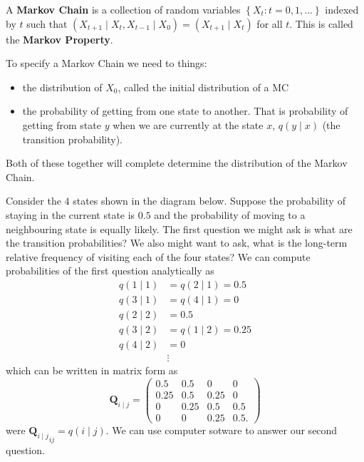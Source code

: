 \begin{defe} \label{defe: markov_chain}
    A {\bf Markov Chain} is a collection of random variables $\left\{ X_t : t = 0,1,\ldots \right\}$ indexed by $t$ such that $(X_{t+1} \mid X_{t} , X_{t-1} \mid X_{0}) = (X_{t+1} \mid X_{t})$ for all $t$. This is called the {\bf Markov Property}.
\end{defe}

To specify a Markov Chain we need to things:
\begin{itemize}
    \item the distribution of $X_0$, called the initial distribution of a MC
    \item the probability of getting from one state to another. That is probability of getting from state $y$ when we are currently at the state $x$, $q (y \mid x)$ (the transition probability).
\end{itemize}
Both of these together will complete determine the distribution of the Markov Chain.

\begin{exam}\label{exam: mc_state_intro}
    Consider the $4$ states shown in the diagram below. Suppose the probability of staying in the current state is $0.5$ and the probability of moving to a neighbouring state is equally likely. The first question we might ask is what are the transition probabilities? We also might want to ask, what is the long-term relative frequency of visiting each of the four states? We can compute probabilities of the first question analytically as
    \begin{align*}
        q (1 \mid 1) & = q (2 \mid 1) = 0.5  \\
        q (3 \mid 1) & = q (4 \mid 1) = 0    \\
        q(2 \mid 2)  & = 0.5                 \\
        q (3 \mid 2) & = q (1 \mid 2) = 0.25 \\
        q(4 \mid 2)  & = 0                   \\
                     & \vdots
    \end{align*}
    which can be written in matrix form as
    \begin{equation*}
        \bm{Q}_{i \mid j} =
        \begin{pmatrix}
            0.5  & 0.5  & 0    & 0     \\
            0.25 & 0.5  & 0.25 & 0     \\
            0    & 0.25 & 0.5  & 0.5   \\
            0    & 0    & 0.25 & 0.5 .
        \end{pmatrix}
    \end{equation*}
    were ${\bm{Q}_{i \mid j}}_{ij} = q(i \mid j)$. We can use computer sotware to answer our second question.
\end{exam}

